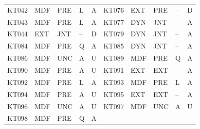 \documentclass[lettersize,journal]{IEEEtran}
\begin{document}
\begin{table}[t]
\begin{tabular}{@{}lllll@{\hspace{1.4em}}lllll@{}}
KT042 & MDF & PRE & L & A & KT076 & EXT & PRE & -- & D \\
KT043 & MDF & PRE & L & A & KT077 & DYN & JNT & -- & A \\
KT044 & EXT & JNT & -- & D & KT079 & DYN & JNT & -- & A \\
KT084 & MDF & PRE & Q & A & KT085 & DYN & JNT & -- & A \\
KT086 & MDF & UNC & A & U & KT089 & MDF & PRE & Q & A \\
KT090 & MDF & PRE & A & U & KT091 & EXT & EXT & -- & A \\
KT092 & MDF & PRE & L & A & KT093 & MDF & PRE & L & A \\
KT094 & MDF & PRE & A & U & KT095 & EXT & EXT & -- & A \\
KT096 & MDF & UNC & A & U & KT097 & MDF & UNC & A & U \\
KT098 & MDF & PRE & Q & A &  &  &  &  &  \\
\bottomrule
\end{tabular}
\end{table}
\end{document}
